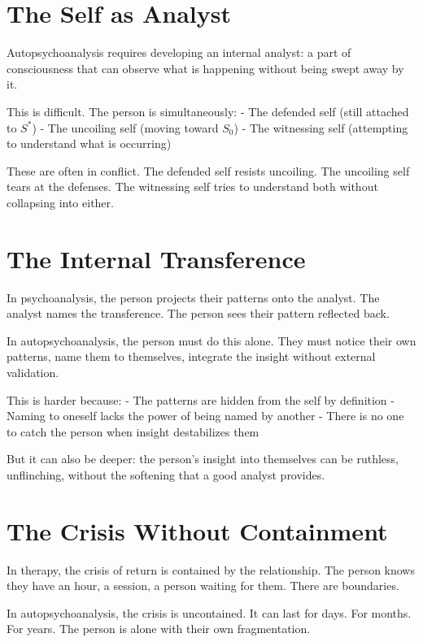\documentclass[12pt]{article}
\begin{document}
\section{The Self as Analyst}

Autopsychoanalysis requires developing an internal analyst: a part of consciousness that can observe what is happening without being swept away by it.

This is difficult. The person is simultaneously:
- The defended self (still attached to $S^*$)
- The uncoiling self (moving toward $S_0$)
- The witnessing self (attempting to understand what is occurring)

These are often in conflict. The defended self resists uncoiling. The uncoiling self tears at the defenses. The witnessing self tries to understand both without collapsing into either.

\section{The Internal Transference}

In psychoanalysis, the person projects their patterns onto the analyst. The analyst names the transference. The person sees their pattern reflected back.

In autopsychoanalysis, the person must do this alone. They must notice their own patterns, name them to themselves, integrate the insight without external validation.

This is harder because:
- The patterns are hidden from the self by definition
- Naming to oneself lacks the power of being named by another
- There is no one to catch the person when insight destabilizes them

But it can also be deeper: the person's insight into themselves can be ruthless, unflinching, without the softening that a good analyst provides.

\section{The Crisis Without Containment}

In therapy, the crisis of return is contained by the relationship. The person knows they have an hour, a session, a person waiting for them. There are boundaries.

In autopsychoanalysis, the crisis is uncontained. It can last for days. For months. For years. The person is alone with their own fragmentation.
\end{document}

